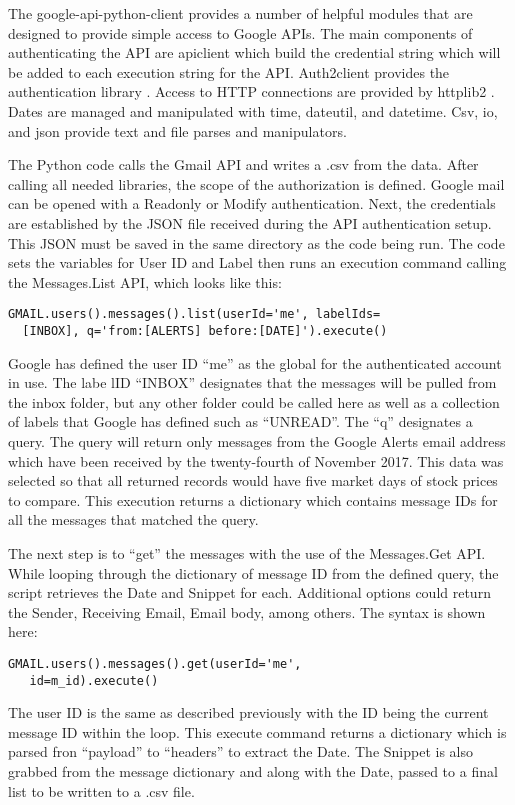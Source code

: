 \documentclass[sigconf]{acmart}
\begin{document}
The google-api-python-client provides a number of helpful modules that are designed to provide simple access to Google APIs. The main components of authenticating the API are apiclient which build the credential string which will be added to each execution string for the API. Auth2client provides the authentication library \cite{www-apiAccess}. Access to HTTP connections are provided by httplib2 \cite{www-http}. Dates are managed and manipulated with time, dateutil, and datetime. Csv, io, and json provide text and file parses and manipulators. 

The Python code calls the Gmail API and writes a .csv from the data. After calling all needed libraries, the scope of the authorization is defined. Google mail can be opened with a Readonly or Modify authentication. Next, the credentials are established by the JSON file received during the API authentication setup. This JSON must be saved in the same directory as the code being run. The code sets the variables for User ID and Label then runs an execution command calling the  Messages.List API, which looks like this:
\begin{verbatim}
GMAIL.users().messages().list(userId='me', labelIds=
  [INBOX], q='from:[ALERTS] before:[DATE]').execute()
\end{verbatim}
Google has defined the user ID ``me'' as the global for the authenticated account in use. The labe lID ``INBOX'' designates that the messages will be pulled from the inbox folder, but any other folder could be called here as well as a collection of labels that Google has defined such as ``UNREAD''. The ``q'' designates a query. The query will return only messages from the Google Alerts email address which have been received by the twenty-fourth of November 2017. This data was selected so that all returned records would have five market days of stock prices to compare. This execution returns a dictionary which contains message IDs for all the messages that matched the query.

The next step is to ``get'' the messages with the use of the Messages.Get API. While looping through the dictionary of message ID from the defined query, the script retrieves the Date and Snippet for each. Additional options could return the Sender, Receiving Email, Email body, among others. The syntax is shown here:
\begin{verbatim}
GMAIL.users().messages().get(userId='me',
   id=m_id).execute()
\end{verbatim}
The user ID is the same as described previously with the ID being the current message ID within the loop. This execute command returns a dictionary which is parsed fron ``payload'' to ``headers'' to extract the Date. The Snippet is also grabbed from the message dictionary and along with the Date, passed to a final list to be written to a .csv file. 
\end{document}
